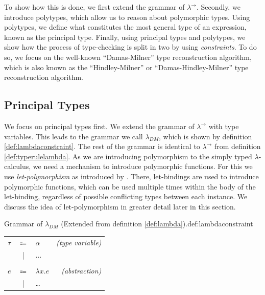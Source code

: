 To show how this is done, we first extend the grammar of $\lambda^\rightarrow$.
Secondly, we introduce polytypes, which allow us to reason about polymorphic types.
Using polytypes, we define what constitutes the most general type of an expression, known as the principal type. 
Finally, using principal types and polytypes, we show how the process of type-checking is split in two by using \textit{constraints}.
To do so, we focus on the well-known ``Damas-Milner''\cite{damas1982principal} type reconstruction algorithm, which is also known as the ``Hindley-Milner'' or ``Damas-Hindley-Milner'' type reconstruction algorithm.

\subsection{Principal Types}
We focus on principal types first.
We extend the grammar of $\lambda^\rightarrow$ with type variables.
This leads to the grammar we call $\lambda_{DM}$, which is shown by definition \ref{def:lambdaconstraint}.
The rest of the grammar is identical to $\lambda^\rightarrow$ from definition \ref{def:typerulelambda}.
As we are introducing polymorphism to the simply typed $\lambda$-calculus, we need a mechanism to introduce polymorphic functions.
For this we use \textit{let-polymorphism} as introduced\cite{milner1978theory} by \citeauthor{milner1978theory}. 
There, let-bindings are used to introduce polymorphic functions, which can be used multiple times within the body of the let-binding, regardless of possible conflicting types between each instance.
We discuss the idea of let-polymorphism in greater detail later in this section.

\begin{definitiontitled}{Grammar of $\lambda_{DM}$ (Extended from definition \ref{def:lambda}).}{def:lambdaconstraint}
\begin{tabular}{lclr}
$\tau$  & $\Coloneqq$ & $\alpha$          &\textit{(type variable)}\\
        & |          & $\ldots$          & \\
\\
$e$     & $\Coloneqq$ & $\lambda x.e$     &\textit{(abstraction)} \\
        & |           & \ldots           & \\
\end{tabular}
\end{definitiontitled}

